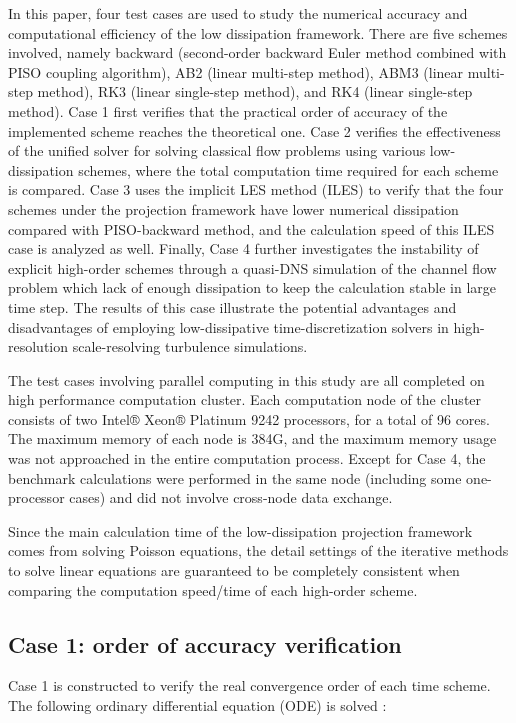 \documentclass{article}
\begin{document}
In this paper, four test cases are used to study the numerical accuracy and computational efficiency of the low dissipation framework. There are five schemes involved, namely backward (second-order backward Euler method combined with PISO coupling algorithm), AB2 (linear multi-step method), ABM3 (linear multi-step method), RK3 (linear single-step method), and RK4 (linear single-step method). Case 1 first verifies that the practical order of accuracy of the implemented scheme reaches the theoretical one. Case 2 verifies the effectiveness of the unified solver for solving classical flow problems using various low-dissipation schemes, where the total computation time required for each scheme is compared. Case 3 uses the implicit LES method (ILES) to verify that the four schemes under the projection framework have lower numerical dissipation compared with PISO-backward method, and the calculation speed of this ILES case is analyzed as well. Finally, Case 4 further investigates the instability of explicit high-order schemes through a quasi-DNS simulation of the channel flow problem which lack of enough dissipation to keep the calculation stable in large time step. The results of this case illustrate the potential advantages and disadvantages of employing low-dissipative time-discretization solvers in high-resolution scale-resolving turbulence simulations.

The test cases involving parallel computing in this study are all completed on high performance computation cluster. Each computation node of the cluster consists of two Intel® Xeon® Platinum 9242 processors, for a total of 96 cores. The maximum memory of each node is 384G, and the maximum memory usage was not approached in the entire computation process. Except for Case 4, the benchmark calculations were performed in the same node (including some one-processor cases) and did not involve cross-node data exchange.

Since the main calculation time of the low-dissipation projection framework comes from solving Poisson equations, the detail settings of the iterative methods to solve linear equations are guaranteed to be completely consistent when comparing the computation speed/time of each high-order scheme.


\subsection{Case 1: order of accuracy verification}

Case 1 is constructed to verify the real convergence order of each time scheme. The following ordinary differential equation (ODE) is solved :
\end{document}
